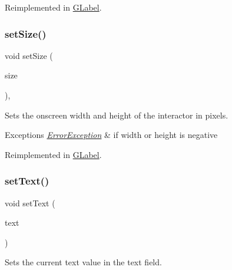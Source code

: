 Reimplemented in \mbox{\hyperlink{classGLabel_ae7e6371aa2311d6f18caf8f7be59704d}{G\+Label}}.

\mbox{\label{classGInteractor_ae2b628228f192c2702c4ce941b2af68f}} 
\subsubsection{\texorpdfstring{set\+Size()}{setSize()}\hspace{0.1cm}{\footnotesize\ttfamily [2/2]}}
{\footnotesize\ttfamily void set\+Size (\begin{DoxyParamCaption}\item[{const \mbox{\hyperlink{classGDimension}{G\+Dimension}} \&}]{size }\end{DoxyParamCaption})\hspace{0.3cm}{\ttfamily [virtual]}, {\ttfamily [inherited]}}



Sets the onscreen width and height of the interactor in pixels. 


\begin{DoxyExceptions}{Exceptions}
{\em \mbox{\hyperlink{classErrorException}{Error\+Exception}}} & if width or height is negative \\
\hline
\end{DoxyExceptions}


Reimplemented in \mbox{\hyperlink{classGLabel_a0fe8cce1a80750f36fa14ee99ca34014}{G\+Label}}.

\mbox{\label{classGTextField_ac1ae51949d41ee9054634be5967d91b8}} 
\subsubsection{\texorpdfstring{set\+Text()}{setText()}}
{\footnotesize\ttfamily void set\+Text (\begin{DoxyParamCaption}\item[{const std\+::string \&}]{text }\end{DoxyParamCaption})\hspace{0.3cm}{\ttfamily [virtual]}}



Sets the current text value in the text field. 

